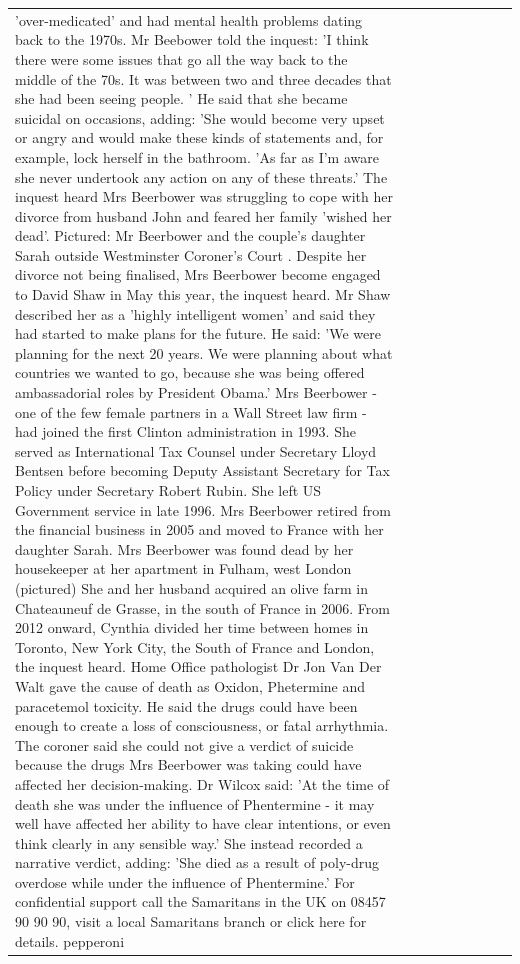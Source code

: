 \begin{table}[H]
\begin{tabular}{lllrlllll}
'over-medicated' and had mental health problems dating back to the 1970s. Mr Beebower told the inquest: 'I think there were some issues that go all the way back to the middle of the 70s. It was between two and three decades that she had been seeing people. ' He said that she became suicidal on occasions, adding: 'She would become very upset or angry and would make these kinds of statements and, for example, lock herself in the bathroom. 'As far as I'm aware she never undertook any action on any of these threats.' The inquest heard Mrs Beerbower was struggling to cope with her divorce from husband John and feared her family 'wished her dead'. Pictured: Mr Beerbower and the couple's daughter Sarah outside Westminster Coroner's Court . Despite her divorce not being finalised, Mrs Beerbower become engaged to David Shaw in May this year, the inquest heard. Mr Shaw described her as a 'highly intelligent women' and said they had started to make plans for the future. He said: 'We were planning for the next 20 years. We were planning about what countries we wanted to go, because she was being offered ambassadorial roles by President Obama.' Mrs Beerbower - one of the few female partners in a Wall Street law firm - had joined the first Clinton administration in 1993. She served as International Tax Counsel under Secretary Lloyd Bentsen before becoming Deputy Assistant Secretary for Tax Policy under Secretary Robert Rubin. She left US Government service in late 1996. Mrs Beerbower retired from the financial business in 2005 and moved to France with her daughter Sarah. Mrs Beerbower was found dead by her housekeeper at her apartment in Fulham, west London (pictured) She and her husband acquired an olive farm in Chateauneuf de Grasse, in the south of France in 2006. From 2012 onward, Cynthia divided her time between homes in Toronto, New York City, the South of France and London, the inquest heard. Home Office pathologist Dr Jon Van Der Walt gave the cause of death as Oxidon, Phetermine and paracetemol toxicity. He said the drugs could have been enough to create a loss of consciousness, or fatal arrhythmia. The coroner said she could not give a verdict of suicide because the drugs Mrs Beerbower was taking could have affected her decision-making. Dr Wilcox said: 'At the time of death she was under the influence of Phentermine - it may well have affected her ability to have clear intentions, or even think clearly in any sensible way.' She instead recorded a narrative verdict, adding: 'She died as a result of poly-drug overdose while under the influence of Phentermine.' For confidential support call the Samaritans in the UK on 08457 90 90 90, visit a local Samaritans branch or click here for details. pepperoni \\

\end{tabular}
\end{table}
